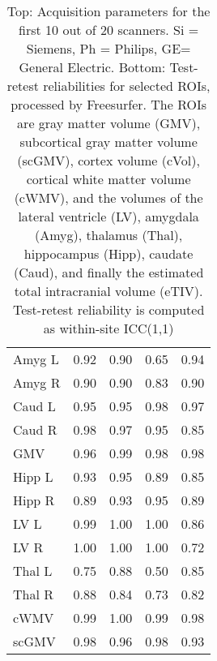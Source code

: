 \begin{table}
\begin{tabular}{lllll}
Amyg L                &               0.92 &               0.90 &                 0.65 &                 0.94 \\
Amyg R                &               0.90 &               0.90 &                 0.83 &                 0.90 \\
Caud L                &               0.95 &               0.95 &                 0.98 &                 0.97 \\
Caud R                &               0.98 &               0.97 &                 0.95 &                 0.85 \\
GMV                   &               0.96 &               0.99 &                 0.98 &                 0.98 \\
Hipp L                &               0.93 &               0.95 &                 0.89 &                 0.85 \\
Hipp R                &               0.89 &               0.93 &                 0.95 &                 0.89 \\
LV L                  &               0.99 &               1.00 &                 1.00 &                 0.86 \\
LV R                  &               1.00 &               1.00 &                 1.00 &                 0.72 \\
Thal L                &               0.75 &               0.88 &                 0.50 &                 0.85 \\
Thal R                &               0.88 &               0.84 &                 0.73 &                 0.82 \\
cWMV                  &               0.99 &               1.00 &                 0.99 &                 0.98 \\
scGMV                 &               0.98 &               0.96 &                 0.98 &                 0.93 \\
\bottomrule
\end{tabular}
\caption{Top: Acquisition parameters for the first 10 out of 20 scanners. Si = Siemens, Ph = Philips, GE= General Electric. Bottom: Test-retest reliabilities for selected ROIs, processed by Freesurfer. The ROIs are gray matter volume (GMV), subcortical gray matter volume (scGMV), cortex volume (cVol), cortical white matter volume (cWMV), and the volumes of the lateral ventricle (LV), amygdala (Amyg), thalamus (Thal), hippocampus (Hipp), caudate (Caud), and finally the estimated total intracranial volume (eTIV). Test-retest reliability is computed as within-site ICC(1,1)} 
\label{tab:acquisition1}

\end{table}